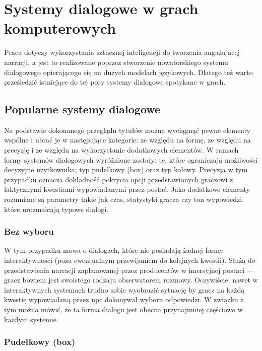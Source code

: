 \graphicspath{{chapters/chapter3/imgs/}}

\chapter{Systemy dialogowe w grach komputerowych}\label{chapter:ch3}

Praca dotyczy wykorzystania sztucznej inteligencji do tworzenia angażującej narracji, a jest
to realizowane poprzez stworzenie nowatorskiego systemu dialogowego opierającego się
na dużych modelach językowych. Dlatego też warto prześledzić istniejące do tej pory systemy
dialogowe spotykane w grach.

\section{Popularne systemy dialogowe}\label{subsection:ch3_1}

Na podstawie dokonanego przeglądu tytułów można wyciągnąć pewne elementy wspólne i ubrać je
w następujące kategorie: ze względu na formę, ze względu na precyzję i ze względu na wykorzystanie
dodatkowych elementów. W ramach formy systemów dialogowych wyróżnione zostały: te, które ograniczają
możliwości decyzyjne użytkownika; typ pudełkowy (box) oraz typ kołowy. Precyzja w tym przypadku
oznacza dokładność pokrycia opcji przedstawionych graczowi z faktycznymi kwestiami wypowiadanymi
przez postać. Jako dodatkowe elementy rozumiane są parametry takie jak czas, statystyki gracza
czy ton wypowiedzi, które urozmaicają typowe dialogi.

\subsection{Bez wyboru}

W tym przypadku mowa o dialogach, które nie posiadają żadnej formy interaktywności (poza
ewentualnym przewijaniem do kolejnych kwestii). Służą do przedstawienia narracji zaplanowanej
przez producentów w imersyjnej postaci --- gracz bowiem jest swoistego rodzaju obserwatorem
rozmowy. Oczywiście, nawet w interaktywnych systemach trudno sobie wyobrazić sytuację by gracz
na każdą kwestię wypowiadaną przez \gls{npc} dokonywał wyboru odpowiedzi. W związku z tym można mówić,
że ta forma dialogu jest obecna przynajmniej częściowo w każdym systemie.

\subsection{Pudełkowy (box)}

